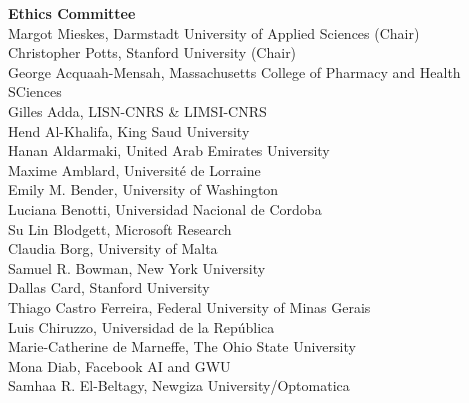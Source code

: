 {\bf Ethics Committee} \\
\hspace*{0.2in} Margot Mieskes, Darmstadt University of Applied Sciences (Chair)\\
\hspace*{0.2in} Christopher Potts, Stanford University (Chair)\\
\hspace*{0.2in} George Acquaah-Mensah, Massachusetts College of Pharmacy and Health SCiences\\
\hspace*{0.2in} Gilles Adda, LISN-CNRS \& LIMSI-CNRS\\
\hspace*{0.2in} Hend Al-Khalifa, King Saud University\\
\hspace*{0.2in} Hanan Aldarmaki, United Arab Emirates University\\
\hspace*{0.2in} Maxime Amblard, Université de Lorraine\\
\hspace*{0.2in} Emily M. Bender, University of Washington\\
\hspace*{0.2in} Luciana Benotti, Universidad Nacional de Cordoba\\
\hspace*{0.2in} Su Lin Blodgett, Microsoft Research\\
\hspace*{0.2in} Claudia Borg, University of Malta\\
\hspace*{0.2in} Samuel R. Bowman, New York University\\
\hspace*{0.2in} Dallas Card, Stanford University\\
\hspace*{0.2in} Thiago Castro Ferreira, Federal University of Minas Gerais\\
\hspace*{0.2in} Luis Chiruzzo, Universidad de la República\\
\hspace*{0.2in} Marie-Catherine de Marneffe, The Ohio State University\\
\hspace*{0.2in} Mona Diab, Facebook AI and GWU\\
\hspace*{0.2in} Samhaa R. El-Beltagy, Newgiza University/Optomatica\\
